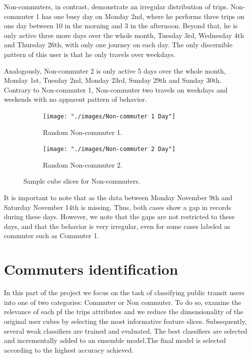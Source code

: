 \documentclass{article}
\begin{document}
Non-commuters, in contrast, demonstrate an irregular distribution of trips. Non-commuter 1 has one busy day on Monday 2nd, where he performs three trips on one day between 10 in the morning and 3 in the afternoon. Beyond that, he is only active three more days over the whole month, Tuesday 3rd, Wednesday 4th and Thursday 26th, with only one journey on each day. The only discernible pattern  of this user is that he only travels over weekdays.

Analogously, Non-commuter 2 is only active 5 days over the whole month, Monday 1st, Tuesday 2nd, Monday 23rd, Sunday 29th and Sunday 30th. Contrary to Non-commuter 1, Non-commuter two travels on weekdays and weekends with no apparent pattern of behavior.

\begin{figure}[H]
  \centering
  \begin{subfigure}[b]{.45\textwidth}
  	\centering
	\texttt{[image: "./images/Non-commuter 1 Day"]}
  	\caption{Random Non-commuter 1.}
  \end{subfigure}
  \begin{subfigure}[b]{.45\textwidth}
  	\centering
	\texttt{[image: "./images/Non-commuter 2 Day"]}
  	\caption{Random Non-commuter 2.}
  \end{subfigure}
  \caption{Sample cube slices for Non-commuters.}
  	\label{fig:preprocessing/cubesNonCom} 
\end{figure}

It is important to note that as the data between Monday November 9th and Saturday November 14th is missing. Thus, both cases show a gap in records during these days. However, we note that the gaps are not restricted to these days, and that the behavior is very irregular, even for some cases labeled as commuter such as Commuter 1. 

\newpage
\section{Commuters identification}
\label{sec:partII}
In this part of the project we focus on the task of classifying public transit users into one of two categories: Commuter or Non commuter. To do so, examine the relevance of each pf the trips attributes and we reduce the dimensionality of the original user cubes by selecting the most informative feature slices. Subsequently, several weak classifiers are trained and evaluated. The best classifiers are selected and incrementally added to an ensemble model.The final model is selected according to the highest accuracy achieved.
\end{document}
